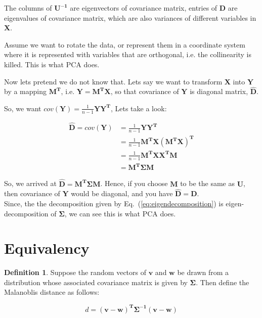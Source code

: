 \documentclass[12pt]{article}
\theoremstyle{plain}
\theoremstyle{definition}
\newtheorem{definition}{Definition}[section]
\theoremstyle{definition}
\begin{document}
The columns of $\mathbf{U^{-1}}$ are eigenvectors of covariance matrix, entries of $\mathbf{D}$
are eigenvalues of covariance matrix, which are also variances of different variables in $\mathbf{X}$.


Assume we want to rotate the data, or represent them in a 
coordinate system where it is represented with variables that are
orthogonal, i.e. the collinearity is killed. This is what PCA does.

Now lets pretend we do not know that. Lets say we want to
transform $\mathbf{X}$ into $\mathbf{Y}$ by a mapping $\mathbf{M^T}$, i.e. $\mathbf{Y= M^TX}$,
so that covariance of $\mathbf{Y}$ is diagonal matrix, $\mathbf{\hat{D}}$. \\
\pagebreak

So, we want $cov(\mathbf{Y}) = \frac{1}{n-1}\mathbf{Y}\mathbf{Y^T}$,
Lets take a look:

\begin{equation}\label{eq:diagonalize}
\begin{aligned}
\mathbf{\hat{D}} = cov({\mathbf{Y}}) &= \frac{1}{n-1}\mathbf{Y}\mathbf{Y^T}\\
                           &= \frac{1}{n-1}\mathbf{M^TX}\mathbf{(M^TX)^T}\\
                           &= \frac{1}{n-1} \mathbf{M^T}\mathbf{XX^T}\mathbf{ M}\\
                           &=  \mathbf{M^T}\mathbf{\Sigma}\mathbf{M}
\end{aligned}
\end{equation}

So, we arrived at $\mathbf{\hat{D}} = \mathbf{M^T}\mathbf{\Sigma}\mathbf{M}$.
Hence, if you choose $\mathbf{M}$ to be the same as $\mathbf{U}$, then
covariance of $\mathbf{Y}$ would be diagonal, and you have $\mathbf{\hat{D}}  = \mathbf{D}$.\\

Since, the the decomposition given by Eq.~(\ref{eq:eigendecomposition})
is eigen-decomposition of $\mathbf{\Sigma}$, we can see this is what PCA does.

\section{Equivalency}

\theoremstyle{definition} 
\begin{definition}
Suppose the random vectors of $\mathbf{v}$ and $\mathbf{w}$ be drawn from a distribution 
whose associated covariance matrix is given by $\mathbf{\Sigma}$. Then define the Malanoblis
distance as follows:

 \begin{equation}\label{eq:mahabDist}
 d = \mathbf{(v - w)^T \Sigma^{-1} (v - w)} 
 \end{equation}
\end{definition}
\end{document}
